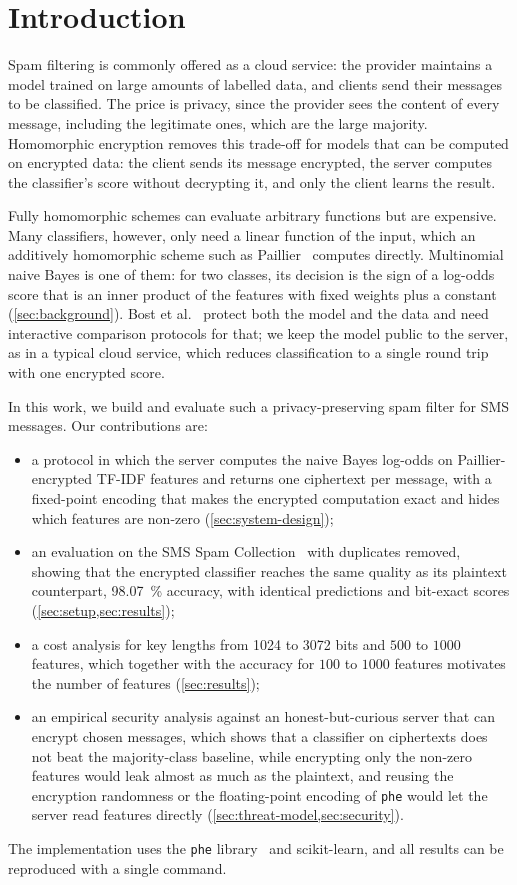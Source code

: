 \section{Introduction}\label{sec:introduction}

Spam filtering is commonly offered as a cloud service: the provider maintains a model trained on large amounts of labelled data, and clients send their messages to be classified.
The price is privacy, since the provider sees the content of every message, including the legitimate ones, which are the large majority.
Homomorphic encryption removes this trade-off for models that can be computed on encrypted data: the client sends its message encrypted, the server computes the classifier's score without decrypting it, and only the client learns the result.

Fully homomorphic schemes can evaluate arbitrary functions but are expensive.
Many classifiers, however, only need a linear function of the input, which an additively homomorphic scheme such as Paillier~\cite{paillier1999} computes directly.
Multinomial naive Bayes is one of them: for two classes, its decision is the sign of a log-odds score that is an inner product of the features with fixed weights plus a constant (\cref{sec:background}).
Bost et al.~\cite{bost2015} protect both the model and the data and need interactive comparison protocols for that; we keep the model public to the server, as in a typical cloud service, which reduces classification to a single round trip with one encrypted score.

In this work, we build and evaluate such a privacy-preserving spam filter for SMS messages.
Our contributions are:
\begin{itemize}
  \item a protocol in which the server computes the naive Bayes log-odds on Paillier-encrypted TF-IDF features and returns one ciphertext per message, with a fixed-point encoding that makes the encrypted computation exact and hides which features are non-zero (\cref{sec:system-design});
  \item an evaluation on the SMS Spam Collection~\cite{smsspam} with duplicates removed, showing that the encrypted classifier reaches the same quality as its plaintext counterpart, \SI{98.07}{\percent} accuracy, with identical predictions and bit-exact scores (\cref{sec:setup,sec:results});
  \item a cost analysis for key lengths from \num{1024} to \num{3072} bits and $500$ to $1000$ features, which together with the accuracy for $100$ to $1000$ features motivates the number of features (\cref{sec:results});
  \item an empirical security analysis against an honest-but-curious server that can encrypt chosen messages, which shows that a classifier on ciphertexts does not beat the majority-class baseline, while encrypting only the non-zero features would leak almost as much as the plaintext, and reusing the encryption randomness or the floating-point encoding of \texttt{phe} would let the server read features directly (\cref{sec:threat-model,sec:security}).
\end{itemize}

The implementation uses the \texttt{phe} library~\cite{phe} and scikit-learn, and all results can be reproduced with a single command.
